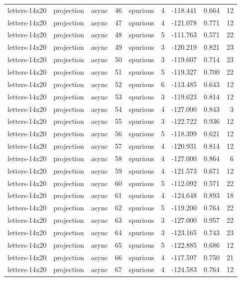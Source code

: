 \begin{tabular}{lllrlrrrr}
letters-14x20 & projection & async & 46 & spurious & 4 & -118.441 & 0.664 & 12 \\
letters-14x20 & projection & async & 47 & spurious & 4 & -121.078 & 0.771 & 12 \\
letters-14x20 & projection & async & 48 & spurious & 5 & -111.763 & 0.571 & 22 \\
letters-14x20 & projection & async & 49 & spurious & 3 & -120.219 & 0.821 & 23 \\
letters-14x20 & projection & async & 50 & spurious & 3 & -119.607 & 0.714 & 23 \\
letters-14x20 & projection & async & 51 & spurious & 5 & -119.327 & 0.700 & 22 \\
letters-14x20 & projection & async & 52 & spurious & 6 & -113.485 & 0.643 & 12 \\
letters-14x20 & projection & async & 53 & spurious & 3 & -119.623 & 0.814 & 12 \\
letters-14x20 & projection & async & 54 & spurious & 4 & -127.000 & 0.843 & 3 \\
letters-14x20 & projection & async & 55 & spurious & 3 & -122.722 & 0.936 & 12 \\
letters-14x20 & projection & async & 56 & spurious & 5 & -118.399 & 0.621 & 12 \\
letters-14x20 & projection & async & 57 & spurious & 4 & -120.931 & 0.814 & 12 \\
letters-14x20 & projection & async & 58 & spurious & 4 & -127.000 & 0.864 & 6 \\
letters-14x20 & projection & async & 59 & spurious & 4 & -121.573 & 0.671 & 12 \\
letters-14x20 & projection & async & 60 & spurious & 5 & -112.092 & 0.571 & 22 \\
letters-14x20 & projection & async & 61 & spurious & 4 & -124.648 & 0.893 & 18 \\
letters-14x20 & projection & async & 62 & spurious & 5 & -119.200 & 0.764 & 22 \\
letters-14x20 & projection & async & 63 & spurious & 3 & -127.000 & 0.957 & 22 \\
letters-14x20 & projection & async & 64 & spurious & 3 & -123.165 & 0.743 & 23 \\
letters-14x20 & projection & async & 65 & spurious & 5 & -122.885 & 0.686 & 12 \\
letters-14x20 & projection & async & 66 & spurious & 4 & -117.597 & 0.750 & 21 \\
letters-14x20 & projection & async & 67 & spurious & 4 & -124.583 & 0.764 & 12 \\

\end{tabular}
